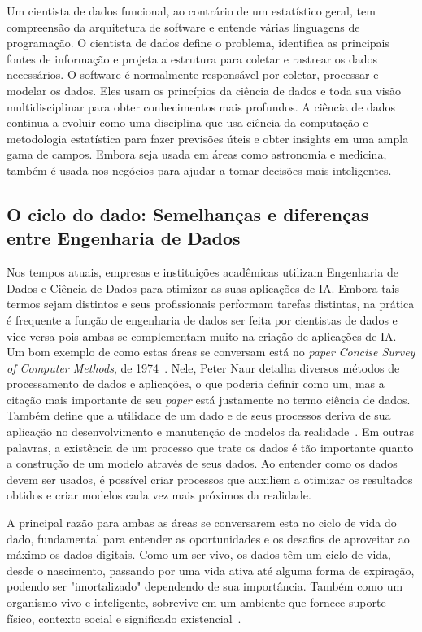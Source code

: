 \documentclass[portugues]{ic-tese}
\begin{document}
Um cientista de dados funcional, ao contrário de um estatístico geral, tem compreensão da arquitetura de software e entende várias linguagens de programação. O cientista de dados define o problema, identifica as principais fontes de informação e projeta a estrutura para coletar e rastrear os dados necessários. O software é normalmente responsável por coletar, processar e modelar os dados. Eles usam os princípios da ciência de dados e toda sua visão multidisciplinar para obter conhecimentos mais profundos. A ciência de dados continua a evoluir como uma disciplina que usa ciência da computação e metodologia estatística para fazer previsões úteis e obter insights em uma ampla gama de campos. Embora seja usada em áreas como astronomia e medicina, também é usada nos negócios para ajudar a tomar decisões mais inteligentes.

\subsection{O ciclo do dado: Semelhanças e diferenças entre Engenharia de Dados}

Nos tempos atuais, empresas e instituições acadêmicas utilizam Engenharia de Dados e Ciência de Dados para otimizar as suas aplicações de IA. Embora tais termos sejam distintos e seus profissionais performam tarefas distintas, na prática é frequente a função de engenharia de dados ser feita por cientistas de dados e vice-versa pois ambas se complementam muito na criação de aplicações de IA. Um bom exemplo de como estas áreas se conversam está no \textit{paper} \textit{Concise Survey of Computer Methods}, de 1974~\citep{Panoply_2017}. Nele, Peter Naur detalha diversos métodos de processamento de dados e aplicações, o que poderia definir como um, mas a citação mais importante de seu \textit{paper} está justamente no termo ciência de dados. Também define que a utilidade de um dado e de seus processos deriva de sua aplicação no desenvolvimento e manutenção de modelos da realidade~\citep{Foote_2021}. Em outras palavras, a existência de um processo que trate os dados é tão importante quanto a construção de um modelo através de seus dados. Ao entender como os dados devem ser usados, é possível criar processos que auxiliem a otimizar os resultados obtidos e criar modelos cada vez mais próximos da realidade.

A principal razão para ambas as áreas se conversarem esta no ciclo de vida do dado, fundamental para entender as oportunidades e os desafios de aproveitar ao máximo os dados digitais. Como um ser vivo, os dados têm um ciclo de vida, desde o nascimento, passando por uma vida ativa até alguma forma de expiração, podendo ser "imortalizado" dependendo de sua importância. Também como um organismo vivo e inteligente, sobrevive em um ambiente que fornece suporte físico, contexto social e significado existencial~\citep{Berman_2018}.
\end{document}
